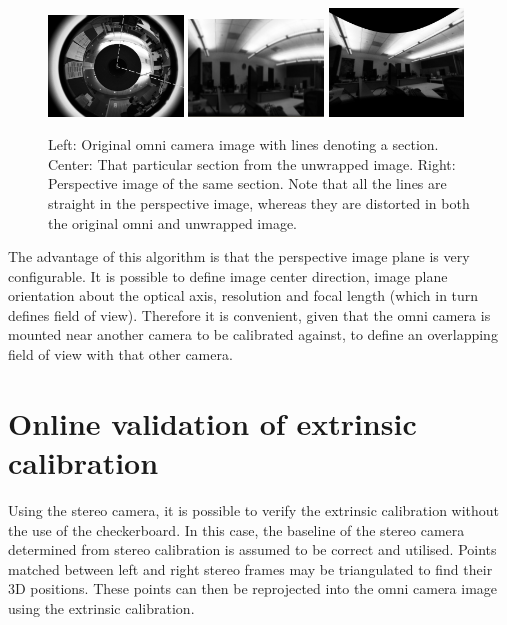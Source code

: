 \begin{figure}[b!]
  \centering
    \includegraphics[width=0.32\textwidth]{chapters/images/omni_raw_office}
    \includegraphics[width=0.32\textwidth]{chapters/images/unwrapped_office}
    \includegraphics[width=0.32\textwidth]{chapters/images/perspective_office}
  \caption{Left: Original omni camera image with lines denoting a section.  Center: That particular section from the unwrapped image.  Right: Perspective image of the same section.  Note that all the lines are straight in the perspective image, whereas they are distorted in both the original omni and unwrapped image.}
  \label{fig:omni_images}
\end{figure}

The advantage of this algorithm is that the perspective image plane is very configurable.  It is possible to define image center direction, image plane orientation about the optical axis, resolution and focal length (which in turn defines field of view).  Therefore it is convenient, given that the omni camera is mounted near another camera to be calibrated against, to define an overlapping field of view with that other camera. 

\section{Online validation of extrinsic calibration}
\label{sec:verification_tool}

Using the stereo camera, it is possible to verify the extrinsic calibration without the use of the checkerboard.  In this case, the baseline of the stereo camera determined from stereo calibration is assumed to be correct and utilised.  Points matched between left and right stereo frames may be triangulated to find their 3D positions.  These points can then be reprojected into the omni camera image using the extrinsic calibration.


